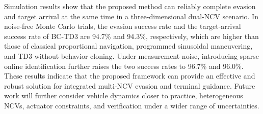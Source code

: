 Simulation results show that the proposed method can reliably complete evasion and target arrival at the same time in a three-dimensional dual-NCV scenario. In noise-free Monte Carlo trials, the evasion success rate and the target-arrival success rate of BC-TD3 are 94.7\% and 94.3\%, respectively, which are higher than those of classical proportional navigation, programmed sinusoidal maneuvering, and TD3 without behavior cloning. Under measurement noise, introducing sparse online identification further raises the two success rates to 96.7\% and 96.0\%. These results indicate that the proposed framework can provide an effective and robust solution for integrated multi-NCV evasion and terminal guidance. Future work will further consider vehicle dynamics closer to practice, heterogeneous NCVs, actuator constraints, and verification under a wider range of uncertainties.
